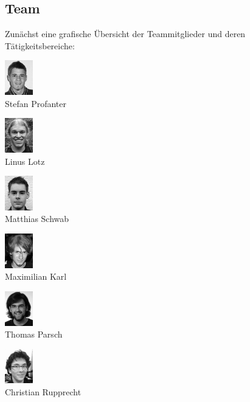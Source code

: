 \documentclass[12pt,a4paper]{article}
\begin{document}
\subsection{Team}
Zunächst eine grafische Übersicht der Teammitglieder und deren Tätigkeitsbereiche:\\
\begin{multicols}{2}{
\begin{list}{ }
	\item    \includegraphics[height=1.5cm]{./face_Fanter.png}     \\      Stefan Profanter	
	\item    \includegraphics[height=1.5cm]{./face_Lotz.png}       \\      Linus Lotz 
	\item    \includegraphics[height=1.5cm]{./face_Matthias.png}   \\      Matthias Schwab	
	\item    \includegraphics[height=1.5cm]{./face_Maxikay.png}    \\      Maximilian Karl
	\item    \includegraphics[height=1.5cm]{./face_Parsch.png}     \\      Thomas Parsch		
	\item 	\includegraphics[height=1.5cm]{./face_Rupprecht.png}   \\      Christian Rupprecht

\end{list}}
\end{multicols}
\end{document}
